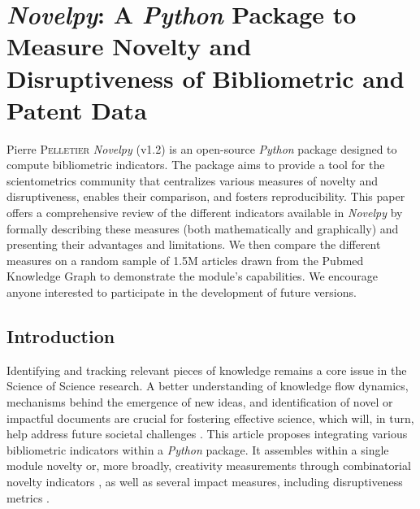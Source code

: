\chapter{\textit{Novelpy}: A \textit{Python} Package to Measure Novelty and Disruptiveness of  Bibliometric and Patent Data}

\begin{chapabstract}{\small Pierre \textsc{Pelletier}} %
     \small \textit{Novelpy} (v1.2) is an open-source \textit{Python} package designed to compute bibliometric indicators. The package aims to provide a tool for the scientometrics community that centralizes various measures of novelty and disruptiveness, enables their comparison, and fosters reproducibility. This paper offers a comprehensive review of the different indicators available in \textit{Novelpy} by formally describing these measures (both mathematically and graphically) and presenting their advantages and limitations. We then compare the different measures on a random sample of 1.5M articles drawn from the Pubmed Knowledge Graph to demonstrate the module's capabilities. We encourage anyone interested to participate in the development of future versions.
\end{chapabstract}


\section{Introduction}
\label{sec:introduction}

Identifying and tracking relevant pieces of knowledge remains a core issue in the Science of Science research. A better understanding of knowledge flow dynamics, mechanisms behind the emergence of new ideas, and identification of novel or impactful documents are crucial for fostering effective science, which will, in turn, help address future societal challenges \citep{fortunato2018science, foster2021surprise, ocde}.
This article proposes integrating various bibliometric indicators within a \textit{Python} package. It assembles within a single module novelty or, more broadly, creativity measurements through combinatorial novelty indicators \citep{uzzi2013atypical,foster2015tradition,lee2015creativity,wang2017bias,shibayama2021measuring}, as well as several impact measures, including disruptiveness metrics \citep{wu2019large,wu2019solo,wu_wu_2019,bu2019multi,bornmann1911disruption}.

